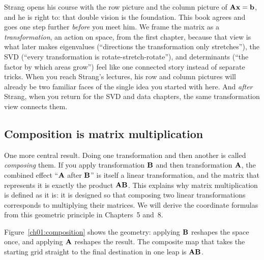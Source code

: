 \begin{strangbox}
Strang opens his course with the row picture and the column picture of $\mathbf{A}\mathbf{x}=\mathbf{b}$,
and he is right to: that double vision is the foundation. This book agrees and goes one step further
\emph{before} you meet him. We frame the matrix as a \emph{transformation}, an action on space,
from the first chapter, because that view is what later makes eigenvalues (``directions the
transformation only stretches''), the SVD (``every transformation is rotate-stretch-rotate''), and
determinants (``the factor by which areas grow'') feel like one connected story instead of separate
tricks. When you reach Strang's lectures, his row and column pictures will already be two
familiar faces of the single idea you started with here. And \emph{after} Strang, when you return for
the SVD and data chapters, the same transformation view connects them.
\end{strangbox}

\subsection{Composition is matrix multiplication}

One more central result. Doing one transformation and then another is called \emph{composing} them.
If you apply transformation $\mathbf{B}$ and then transformation
$\mathbf{A}$, the combined effect ``$\mathbf{A}$ after $\mathbf{B}$'' is itself a linear transformation, and the
matrix that represents it is exactly the product $\mathbf{A}\mathbf{B}$. This explains why matrix
multiplication is defined as it is: it is designed so that composing two linear transformations
corresponds to multiplying their matrices. We
will derive the coordinate formulas from this geometric principle in Chapters~5 and~8.

Figure~\ref{ch01:composition} shows the geometry: applying $\mathbf{B}$ reshapes the space once, and
applying $\mathbf{A}$ reshapes the result. The composite map that takes the starting grid straight to the
final destination in one leap is $\mathbf{A}\mathbf{B}$.

